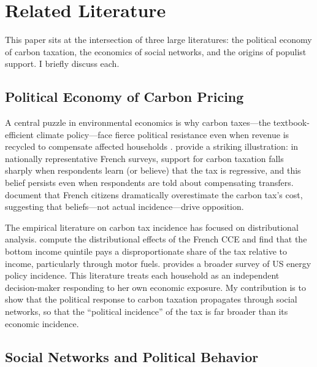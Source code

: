 \documentclass[12pt]{article}
\begin{document}

\section{Related Literature}
\label{sec:literature}

This paper sits at the intersection of three large literatures: the political economy of carbon taxation, the economics of social networks, and the origins of populist support. I briefly discuss each.

\subsection{Political Economy of Carbon Pricing}

A central puzzle in environmental economics is why carbon taxes---the textbook-efficient climate policy---face fierce political resistance even when revenue is recycled to compensate affected households \citep{klenert2018carbon, nordhaus2019climate, stiglitz2019addressing}. \citet{douenne2022yellow} provide a striking illustration: in nationally representative French surveys, support for carbon taxation falls sharply when respondents learn (or believe) that the tax is regressive, and this belief persists even when respondents are told about compensating transfers. \citet{douenne2020french} document that French citizens dramatically overestimate the carbon tax's cost, suggesting that beliefs---not actual incidence---drive opposition.

The empirical literature on carbon tax incidence has focused on distributional analysis. \citet{bureau2019distributional} compute the distributional effects of the French CCE and find that the bottom income quintile pays a disproportionate share of the tax relative to income, particularly through motor fuels. \citet{metcalf2019distributional} provides a broader survey of US energy policy incidence. This literature treats each household as an independent decision-maker responding to her own economic exposure. My contribution is to show that the political response to carbon taxation propagates through social networks, so that the ``political incidence'' of the tax is far broader than its economic incidence.

\subsection{Social Networks and Political Behavior}
\end{document}
